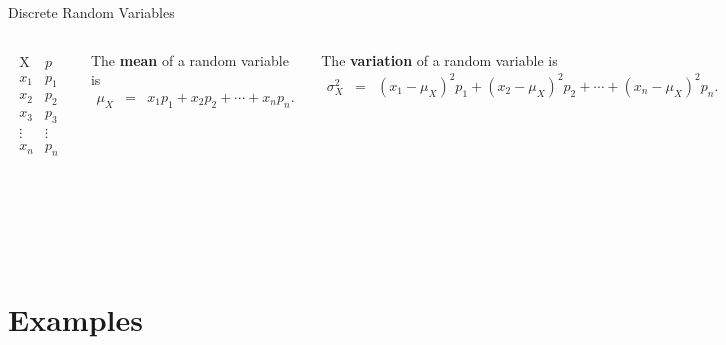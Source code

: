\begin{frame}{Discrete Random Variables}

  \begin{columns}
    \begin{eqnarray*}
      \begin{array}{l|l}
        \mathrm{X} & p \\ \hline
        x_1 & p_1 \\
        x_2 & p_2 \\
        x_3 & p_3 \\
        \vdots & \vdots \\
        x_n & p_n
      \end{array}
    \end{eqnarray*}
    \vfill

    {
      \begin{definition}
        The \textbf{mean} of a random variable is
        \begin{eqnarray*}
          \mu_X & = & x_1 p_1 + x_2 p_2 + \cdots + x_n p_n.
        \end{eqnarray*}
      \end{definition}
    }

    {
      \begin{definition}
        The \textbf{variation} of a random variable is
        \begin{eqnarray*}
          \sigma^2_X & = & (x_1-\mu_X)^2 p_1 + (x_2-\mu_X)^2 p_2 + \cdots + (x_n-\mu_X)^2 p_n.
        \end{eqnarray*}
      \end{definition}
    }

    {
      \begin{definition}
        The \textbf{standard deviation} of a random variable is the
        square root of the variance.
      \end{definition}
    }

    
  \end{columns}
  
\end{frame}


\section{Examples}

